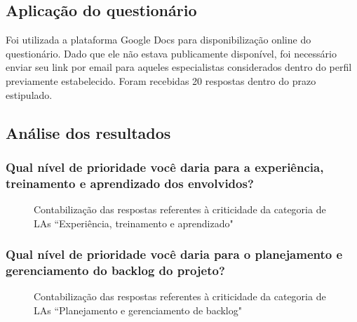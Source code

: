 \subsection{Aplicação do questionário}

Foi utilizada a plataforma Google Docs para disponibilização online do questionário. Dado que ele não estava publicamente disponível, foi necessário enviar seu link por email para aqueles especialistas considerados dentro do perfil previamente estabelecido. Foram recebidas 20 respostas dentro do prazo estipulado.

\subsection{Análise dos resultados}

\subsubsection{Qual nível de prioridade você daria para a experiência, treinamento e aprendizado dos envolvidos?}

\begin{figure}[H]
	\centering
	\captionsetup{justification=centering}
	\caption{Contabilização das respostas referentes à criticidade da categoria de LAs ``Experiência, treinamento e aprendizado"}
	\label{fig:result-exp}
\end{figure}


\subsubsection{Qual nível de prioridade você daria para o planejamento e gerenciamento do backlog do projeto?}

\begin{figure}[H]
	\centering
	\captionsetup{justification=centering}
	\caption{Contabilização das respostas referentes à criticidade da categoria de LAs ``Planejamento e gerenciamento de backlog"}
	\label{fig:result-backlog}
\end{figure}

